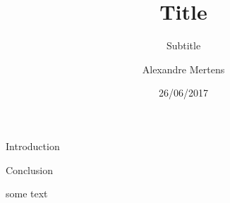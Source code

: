 \documentclass{beamer}
\title{Title}
\subtitle{Subtitle}
\date[26juin2017]{26/06/2017}
\author[Alexandre]{Alexandre Mertens}
\begin{document}
\begin{frame}
\titlepage
\end{frame}

\begin{frame}{Introduction}
\end{frame}

\begin{frame}{Conclusion}

some text

\end{frame}
\end{document}
